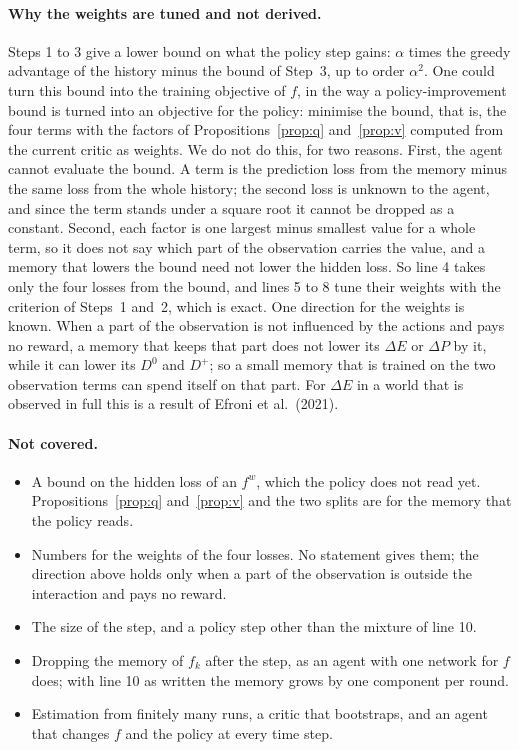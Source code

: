 \documentclass[11pt]{article}
\theoremstyle{definition}
\newcommand{\dE}{\Delta E}
\newcommand{\dP}{\Delta P}
\begin{document}
\paragraph{Why the weights are tuned and not derived.} Steps 1 to 3 give a lower bound on what the policy step gains: $\alpha$ times the greedy advantage of the history minus the bound of Step~3, up to order $\alpha^2$. One could turn this bound into the training objective of $f$, in the way a policy-improvement bound is turned into an objective for the policy: minimise the bound, that is, the four terms with the factors of Propositions~\ref{prop:q} and~\ref{prop:v} computed from the current critic as weights. We do not do this, for two reasons. First, the agent cannot evaluate the bound. A term is the prediction loss from the memory minus the same loss from the whole history; the second loss is unknown to the agent, and since the term stands under a square root it cannot be dropped as a constant. Second, each factor is one largest minus smallest value for a whole term, so it does not say which part of the observation carries the value, and a memory that lowers the bound need not lower the hidden loss. So line 4 takes only the four losses from the bound, and lines 5 to 8 tune their weights with the criterion of Steps~1 and~2, which is exact. One direction for the weights is known. When a part of the observation is not influenced by the actions and pays no reward, a memory that keeps that part does not lower its $\dE$ or $\dP$ by it, while it can lower its $D^0$ and $D^+$; so a small memory that is trained on the two observation terms can spend itself on that part. For $\dE$ in a world that is observed in full this is a result of Efroni et al.\ (2021).

\paragraph{Not covered.}
\begin{itemize}\setlength{\itemsep}{0pt}
\item A bound on the hidden loss of an $f^w$, which the policy does not read yet. Propositions~\ref{prop:q} and~\ref{prop:v} and the two splits are for the memory that the policy reads.
\item Numbers for the weights of the four losses. No statement gives them; the direction above holds only when a part of the observation is outside the interaction and pays no reward.
\item The size of the step, and a policy step other than the mixture of line 10.
\item Dropping the memory of $f_k$ after the step, as an agent with one network for $f$ does; with line 10 as written the memory grows by one component per round.
\item Estimation from finitely many runs, a critic that bootstraps, and an agent that changes $f$ and the policy at every time step.
\end{itemize}
\end{document}
